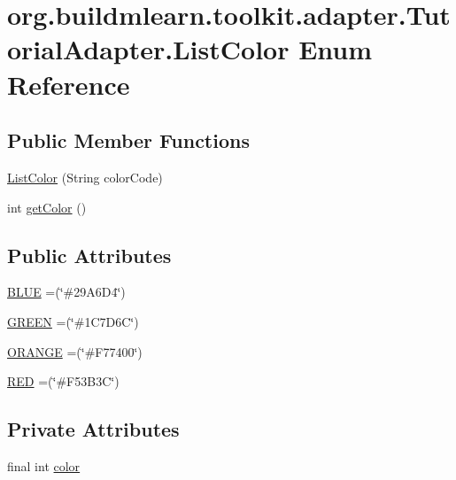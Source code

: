 \hypertarget{enumorg_1_1buildmlearn_1_1toolkit_1_1adapter_1_1TutorialAdapter_1_1ListColor}{}\section{org.\+buildmlearn.\+toolkit.\+adapter.\+Tutorial\+Adapter.\+List\+Color Enum Reference}
\label{enumorg_1_1buildmlearn_1_1toolkit_1_1adapter_1_1TutorialAdapter_1_1ListColor}
\subsection*{Public Member Functions}
\begin{DoxyCompactItemize}
\item 
\hyperlink{enumorg_1_1buildmlearn_1_1toolkit_1_1adapter_1_1TutorialAdapter_1_1ListColor_a89574f3e7d3f13d461907d309edfb38d}{List\+Color} (String color\+Code)
\item 
int \hyperlink{enumorg_1_1buildmlearn_1_1toolkit_1_1adapter_1_1TutorialAdapter_1_1ListColor_aa628b1928305e28933cb6418104f4627}{get\+Color} ()
\end{DoxyCompactItemize}
\subsection*{Public Attributes}
\begin{DoxyCompactItemize}
\item 
\hyperlink{enumorg_1_1buildmlearn_1_1toolkit_1_1adapter_1_1TutorialAdapter_1_1ListColor_a2ecc491e909b9ebb8be7f6cb5a067da6}{B\+L\+UE} =(\char`\"{}\#29\+A6\+D4\char`\"{})
\item 
\hyperlink{enumorg_1_1buildmlearn_1_1toolkit_1_1adapter_1_1TutorialAdapter_1_1ListColor_a567997e55f26dd5faf98d7030e6e75a9}{G\+R\+E\+EN} =(\char`\"{}\#1\+C7\+D6\+C\char`\"{})
\item 
\hyperlink{enumorg_1_1buildmlearn_1_1toolkit_1_1adapter_1_1TutorialAdapter_1_1ListColor_a17c335d0ac279da5031a40c052339a65}{O\+R\+A\+N\+GE} =(\char`\"{}\#F77400\char`\"{})
\item 
\hyperlink{enumorg_1_1buildmlearn_1_1toolkit_1_1adapter_1_1TutorialAdapter_1_1ListColor_a511d8098c47f1445e66c286bf3528f33}{R\+ED} =(\char`\"{}\#F53\+B3C\char`\"{})
\end{DoxyCompactItemize}
\subsection*{Private Attributes}
\begin{DoxyCompactItemize}
\item 
final int \hyperlink{enumorg_1_1buildmlearn_1_1toolkit_1_1adapter_1_1TutorialAdapter_1_1ListColor_a44b55b82b33f8cd31c0c02e77d74e9b7}{color}
\end{DoxyCompactItemize}


